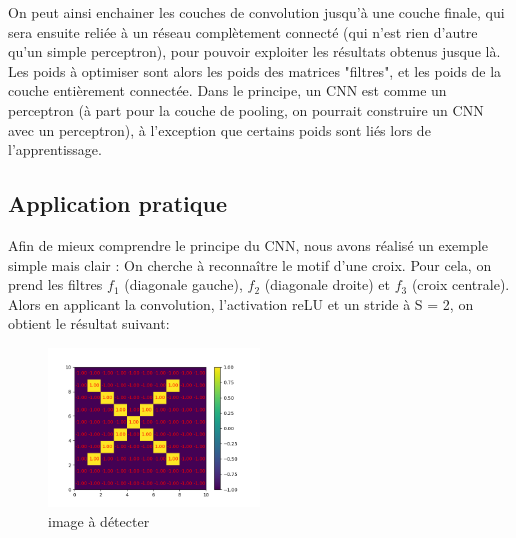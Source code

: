 On peut ainsi enchainer les couches de convolution jusqu'à une couche finale, qui sera ensuite reliée à un réseau complètement connecté (qui n'est rien d'autre qu'un simple perceptron), pour pouvoir exploiter les résultats obtenus jusque là.
Les poids à optimiser sont alors les poids des matrices "filtres", et les poids de la couche entièrement connectée.
Dans le principe, un CNN est comme un perceptron (à part pour la couche de pooling, on pourrait construire un CNN avec un perceptron), à l'exception que certains poids sont liés lors de l'apprentissage. 

\subsection{Application pratique}

Afin de mieux comprendre le principe du CNN, nous avons réalisé un exemple simple mais clair : 
On cherche à reconnaître le motif d'une croix. 
Pour cela, on prend les filtres $f_1$ (diagonale gauche), $f_2$ (diagonale droite) et $f_3$ (croix centrale).
Alors en applicant la convolution, l'activation reLU et un stride à S = 2, on obtient le résultat suivant:

\begin{figure}[h]
    \center
    \includegraphics[width=0.5\textwidth]{img/cnn_exemple/cross/image_croix.png}
    \caption{image à détecter}
\end{figure}


